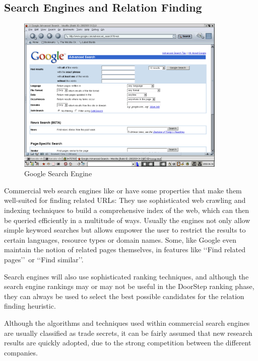 \documentclass[a4paper]{danarticle}
\theoremstyle{remark}
\begin{document}
     \subsection{Search Engines and Relation Finding}
       \begin{figure}[ht]
         \centering
         \includegraphics[width=10cm]{googleadv}
         \caption{Google Search Engine}
         \label{googleadv}
       \end{figure}
       Commercial web search engines like \cite{google} or \cite{altavista} have 
       some properties that make them well-suited for finding related URLs: They 
       use sophisticated web crawling and indexing techniques to build a 
       comprehensive index of the web, which can then be queried efficiently in 
       a multitude of ways. Usually the engines not only allow simple keyword 
       searches but allows empower the user to restrict the results to certain 
       languages, resource types or domain names. Some, like Google\cite{google} 
       even maintain the notion of related pages themselves, in features like 
       \lq\lq Find related pages\rq\rq\ or \lq\lq Find similar\rq\rq . 
  
       Search engines will also use sophisticated ranking techniques, and 
       although the search engine rankings may or may not be useful in the 
       DoorStep ranking phase, they can always be used to select the best 
       possible candidates for the relation finding heuristic.
       
       Although the algorithms and techniques used within commercial search 
       engines are usually classified as trade secrets, it can be fairly assumed 
       that new research results are quickly adopted, due to the strong 
       competition between the different companies.
       
\end{document}
